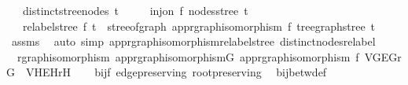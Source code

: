 \begin{isabellebody}
\ \ \ {\isachardoublequoteopen}distinct{\isacharunderscore}{\kern0pt}stree{\isacharunderscore}{\kern0pt}nodes\ t{\isachardoublequoteclose}\isanewline
\ \ \ \ \ {\isachardoublequoteopen}inj{\isacharunderscore}{\kern0pt}on\ f\ {\isacharparenleft}{\kern0pt}nodes{\isacharunderscore}{\kern0pt}stree\ t{\isacharparenright}{\kern0pt}{\isachardoublequoteclose}\isanewline
\ \ \ {\isachardoublequoteopen}relabel{\isacharunderscore}{\kern0pt}stree\ f\ t\ {\isacharequal}{\kern0pt}\ stree{\isacharunderscore}{\kern0pt}of{\isacharunderscore}{\kern0pt}graph\ {\isacharparenleft}{\kern0pt}app{\isacharunderscore}{\kern0pt}rgraph{\isacharunderscore}{\kern0pt}isomorphism\ f\ {\isacharparenleft}{\kern0pt}tree{\isacharunderscore}{\kern0pt}graph{\isacharunderscore}{\kern0pt}stree\ t{\isacharparenright}{\kern0pt}{\isacharparenright}{\kern0pt}{\isachardoublequoteclose}\isanewline
%
\isadelimproof
\ \ %
\endisadelimproof
%
\isatagproof
{}\isamarkupfalse%
\ assms\ \isamarkupfalse%
\ {\isacharparenleft}{\kern0pt}auto\ simp{\isacharcolon}{\kern0pt}\ app{\isacharunderscore}{\kern0pt}rgraph{\isacharunderscore}{\kern0pt}isomorphism{\isacharunderscore}{\kern0pt}relabel{\isacharunderscore}{\kern0pt}stree\ distinct{\isacharunderscore}{\kern0pt}nodes{\isacharunderscore}{\kern0pt}relabel{\isacharparenright}{\kern0pt}%
\endisatagproof
{\isafoldproof}%
%
\isadelimproof
\isanewline
%
\endisadelimproof
\isanewline
{}\isamarkupfalse%
\ {\isacharparenleft}{\kern0pt}\ rgraph{\isacharunderscore}{\kern0pt}isomorphism{\isacharparenright}{\kern0pt}\ app{\isacharunderscore}{\kern0pt}rgraph{\isacharunderscore}{\kern0pt}isomorphism{\isacharunderscore}{\kern0pt}G{\isacharcolon}{\kern0pt}\ {\isachardoublequoteopen}app{\isacharunderscore}{\kern0pt}rgraph{\isacharunderscore}{\kern0pt}isomorphism\ f\ {\isacharparenleft}{\kern0pt}V\isactrlsub G{\isacharcomma}{\kern0pt}E\isactrlsub G{\isacharcomma}{\kern0pt}r\isactrlsub G{\isacharparenright}{\kern0pt}\ {\isacharequal}{\kern0pt}\ {\isacharparenleft}{\kern0pt}V\isactrlsub H{\isacharcomma}{\kern0pt}E\isactrlsub H{\isacharcomma}{\kern0pt}r\isactrlsub H{\isacharparenright}{\kern0pt}{\isachardoublequoteclose}\isanewline
%
\isadelimproof
\ \ %
\endisadelimproof
%
\isatagproof
{}\isamarkupfalse%
\ bij{\isacharunderscore}{\kern0pt}f\ edge{\isacharunderscore}{\kern0pt}preserving\ root{\isacharunderscore}{\kern0pt}preserving\ \isamarkupfalse%
\ bij{\isacharunderscore}{\kern0pt}betw{\isacharunderscore}{\kern0pt}def\ \isamarkupfalse%

\end{isabellebody}
